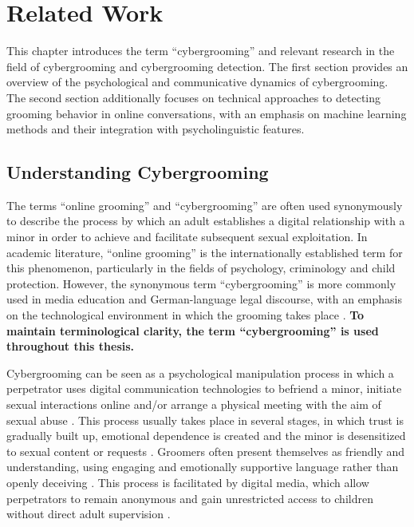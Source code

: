\chapter{Related Work}

This chapter introduces the term “cybergrooming” and relevant research in the field of cybergrooming and cybergrooming detection. The first section provides an overview of the psychological and communicative dynamics of cybergrooming. The second section additionally focuses on technical approaches to detecting grooming behavior in online conversations, with an emphasis on machine learning methods and their integration with psycholinguistic features.


\section{Understanding Cybergrooming}


The terms “online grooming” and “cybergrooming” are often used synonymously to describe the process by which an adult establishes a digital relationship with a minor in order to achieve and facilitate subsequent sexual exploitation. In academic literature, “online grooming” is the internationally established term for this phenomenon, particularly in the fields of psychology, criminology and child protection. However, the synonymous term “cybergrooming” is more commonly used in media education and German-language legal discourse, with an emphasis on the technological environment in which the grooming takes place \parencite{mladenovic2021cyber, schittenhelm2024cybergrooming}. \textbf{To maintain terminological clarity, the term “cybergrooming” is used throughout this thesis. } %

Cybergrooming can be seen as a psychological manipulation process in which a perpetrator uses digital communication technologies to befriend a minor, initiate sexual interactions online and/or arrange a physical meeting with the aim of sexual abuse \parencite{webster2021european}. This process usually takes place in several stages, in which trust is gradually built up, emotional dependence is created and the minor is desensitized to sexual content or requests \parencite{whittle2013review}. Groomers often present themselves as friendly and understanding, using engaging and emotionally supportive language rather than openly deceiving \parencite{broome2020psycholinguistic}. This process is facilitated by digital media, which allow perpetrators to remain anonymous and gain unrestricted access to children without direct adult supervision \parencite{mladenovic2021cyber}. %


